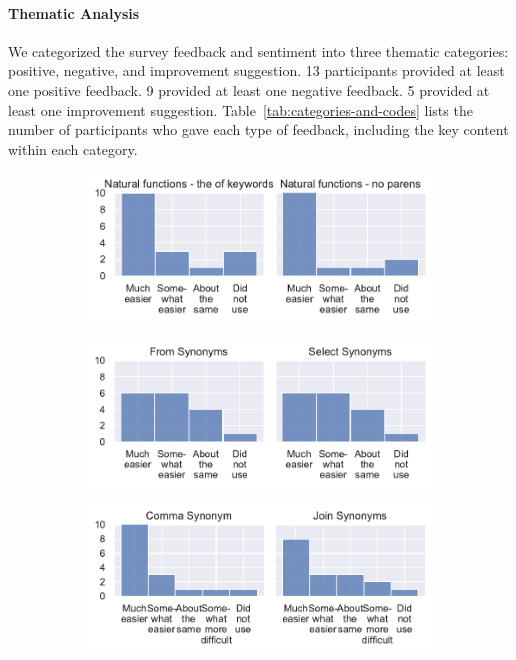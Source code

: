 \paragraph{\textbf{Thematic Analysis}} 
We categorized the survey feedback and sentiment into three thematic categories: positive, negative, and improvement suggestion. 13 participants provided at least one positive feedback. 
9 provided at least one negative feedback. 5 provided at least one improvement suggestion. 
Table~\ref{tab:categories-and-codes} lists the number of participants who gave each type of feedback, including the key content within each category. 

\begin{figure}
  \centering
  \begin{subfigure}{\linewidth}
    \centering
    \includegraphics[width=\linewidth]{figures/survey-feedback/function-feedback.pdf}
  \end{subfigure}
  \begin{subfigure}{\linewidth}
    \centering
    \includegraphics[width=\linewidth]{figures/survey-feedback/synonym-feedback-1.pdf}
  \end{subfigure}
  \begin{subfigure}{\linewidth}
    \centering
    \includegraphics[width=\linewidth]{figures/survey-feedback/synonym-feedback-2.pdf}

\end{subfigure}
\end{figure}
